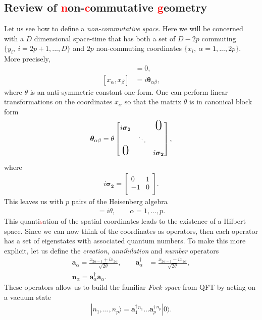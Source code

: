     \subsection{Review of \textcolor{red}{n}on-\textcolor{red}{c}ommutative \textcolor{red}{g}eometry}
    Let us see how to define a \textit{non-commutative space}. Here we will be concerned with a $D$ dimensional space-time that has both a set of $D-2p$ commuting $\{ y_i, \ i=2p+1,...,D\}$ and $2p$ non-commuting coordinates $\{ x_i, \ \alpha =1,...,2p\}$. More precisely,
    \begin{align}
        [y_i, y_j] &=0,\\
        [x_{\alpha}, x_{\beta}] &=i \bm{\theta}_{\alpha \beta}, \label{eq:space_time_commutations}
    \end{align}
    where $\theta$ is an anti-symmetric constant one-form. One can perform linear transformations on the coordinates $x_{\alpha}$ so that the matrix $\theta$ is in canonical block form
    \begin{align}
        \bm{\theta}_{\alpha \beta } = \theta \begin{bmatrix}
            i \bm{\sigma_2} &  & \text{\huge0} \\
                     & \ddots &  \\
                    \text{\huge0} &  & i \bm{\sigma_2} \\
                \end{bmatrix},
    \end{align}
    where 
    \begin{align}
        i \bm{\sigma_2} = \begin{bmatrix}
            0 & 1 \\
            -1 & 0 \\
        \end{bmatrix}.
    \end{align}
    This leaves us with $p$ pairs of the Heisenberg algebra
    \begin{align}
        [x_{2\alpha -1}, x_{2\alpha}]=i\theta, \qquad \alpha=1,...,p.
    \end{align}
    This quanti\textcolor{red}{s}ation of the spatial coordinates leads to the existence of a Hilbert space. Since we can now think of the coordinates as operators, then each operator has a set of eigenstates with associated quantum numbers. To make this more explicit, let us define the \textit{creation}, \textit{annihilation} and \textit{number} operators
    \begin{align}
        \bm{a}_{\alpha} = \frac{x_{2\alpha-1} +i x_{2\alpha}}{\sqrt{2 \theta}}, \qquad \bm{a}^{\dag}_{\alpha} &= \frac{x_{2\alpha-1} -i x_{2\alpha}}{\sqrt{2 \theta}}, \\
        \bm{n}_{\alpha} = \bm{a}^{\dag}_{\alpha}\bm{a}_{\alpha}.
    \end{align}
    These operators allow us to build the familiar \textit{Fock space} from QFT by acting on a vacuum state
    \begin{align}
        |n_1,...,n_p\rangle=  \bm{a}^{\dag}_1^{n_1}... \bm{a}^{\dag}_p^{n_p}|0\rangle.
    \end{align}

